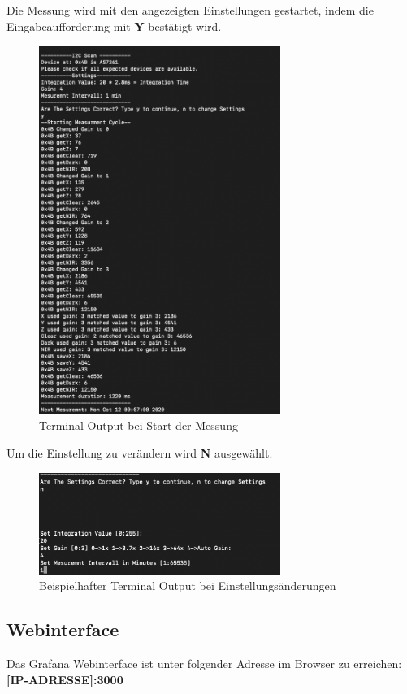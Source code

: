 Die Messung wird mit den angezeigten Einstellungen gestartet, indem die Eingabeaufforderung mit \textbf{Y} bestätigt wird.\\
\begin{figure}[H]
\centering
\includegraphics[width=0.7\textwidth]{img/handbuch/y_start_measurement}
\caption{Terminal Output bei Start der Messung }
\label{fig:Start-der-Messung}
\end{figure}

Um die Einstellung zu verändern wird \textbf{N} ausgewählt.\\
\begin{figure}[H]
\centering
\includegraphics[width=0.7\textwidth]{img/handbuch/n_change_settings}
\caption{Beispielhafter Terminal Output bei Einstellungsänderungen}
\label{fig:changesettings}
\end{figure}
\subsection{Webinterface}
Das Grafana Webinterface ist unter folgender Adresse im Browser zu erreichen:\\
\textbf{[IP-ADRESSE]:3000}

